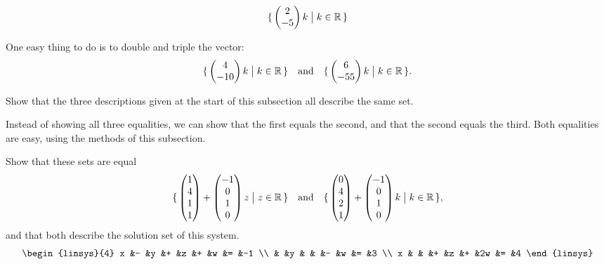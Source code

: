 \begin{exercises}
     \begin{equation*}
       \mbox{$\{\,\begin{pmatrix} 2 \\ -5 \end{pmatrix}k\bigm| k\in\mathbb{R}\,\}$}
     \end{equation*}
     \begin{answer}
       One easy thing to do is to double and triple the vector:
       \begin{equation*}
         \mbox{$\{\,\begin{pmatrix} 4 \\ -10 \end{pmatrix}k\bigm| k\in\mathbb{R}\,\}$}
         \quad\text{and}\quad
         \mbox{$\{\,\begin{pmatrix} 6 \\ -55 \end{pmatrix}k\bigm| k\in\mathbb{R}\,\}$}.
       \end{equation*}
      \end{answer}
  \recommended \item 
    Show that the three descriptions given at the start of this
    subsection all describe the same set.
    \begin{answer}
      Instead of showing all three equalities, we can show that the first
      equals the second, and that the second equals the third.
      Both equalities are easy, using the methods of this subsection.
    \end{answer}
  \recommended \item 
    Show that these sets are equal
    \begin{equation*}
      \mbox{$\{\,\begin{pmatrix} 1 \\ 4 \\ 1 \\ 1 \end{pmatrix}
           +\begin{pmatrix} -1 \\ 0 \\ 1 \\ 0 \end{pmatrix}z\bigm| z\in\mathbb{R}  \,\}$}
      \quad\text{and}\quad
      \mbox{$\{\,\begin{pmatrix} 0 \\ 4 \\ 2 \\ 1 \end{pmatrix}
           +\begin{pmatrix} -1 \\ 0 \\ 1 \\ 0 \end{pmatrix}k\bigm| k\in\mathbb{R}  \,\}$},
    \end{equation*}
    and that both describe the solution set of this system.
    \begin{equation*}  
       \begin{linsys}{4}
         x  &-  &y  &+  &z  &+  &w  &=  &-1  \\
            &   &y  &   &   &-  &w  &=  &3   \\
         x  &   &   &+  &z  &+  &2w &=  &4
       \end{linsys}

\end{equation*}
\end{exercises}
